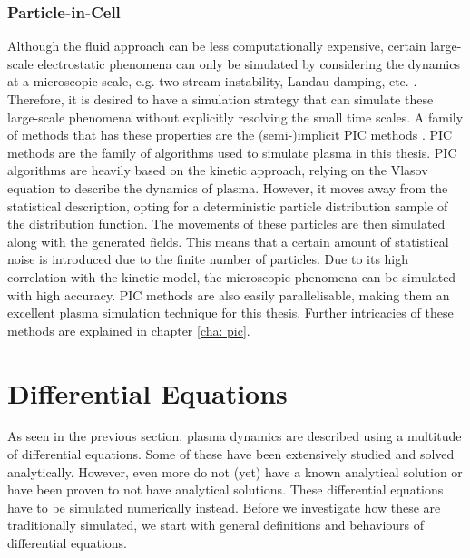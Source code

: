 \subsubsection{Particle-in-Cell}
Although the fluid approach can be less computationally expensive, certain large-scale electrostatic phenomena can only be simulated by considering the dynamics at a microscopic scale, e.g. two-stream instability, Landau damping, etc. \cite{biskamp_magnetic_2000}. Therefore, it is desired to have a simulation strategy that can simulate these large-scale phenomena without explicitly resolving the small time scales. A family of methods that has these properties are the (semi-)implicit PIC methods \cite{markidis_multi-scale_2010}. PIC methods are the family of algorithms used to simulate plasma in this thesis. PIC algorithms are heavily based on the kinetic approach, relying on the Vlasov equation to describe the dynamics of plasma. However, it moves away from the statistical description, opting for a deterministic particle distribution sample of the distribution function. The movements of these particles are then simulated along with the generated fields. This means that a certain amount of statistical noise is introduced due to the finite number of particles. Due to its high correlation with the kinetic model, the microscopic phenomena can be simulated with high accuracy. PIC methods are also easily parallelisable, making them an excellent plasma simulation technique for this thesis. Further intricacies of these methods are explained in chapter \ref{cha: pic}. 


\section{Differential Equations}
\label{sec: DE}
As seen in the previous section, plasma dynamics are described using a multitude of differential equations. Some of these have been extensively studied and solved analytically. However, even more do not (yet) have a known analytical solution or have been proven to not have analytical solutions. These differential equations have to be simulated numerically instead. Before we investigate how these are traditionally simulated, we start with general definitions and behaviours of differential equations.
